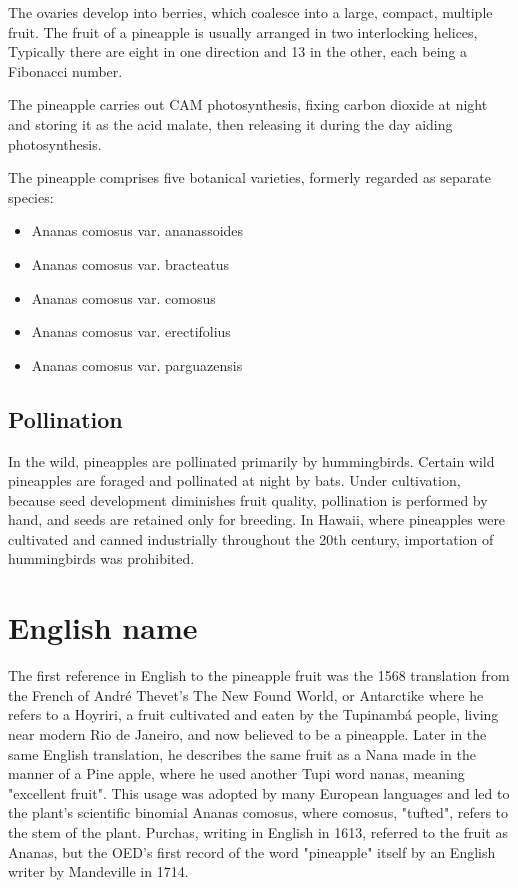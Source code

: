 \documentclass{article}
\begin{document}
The ovaries develop into berries, which coalesce into a large, compact, multiple fruit. The fruit of a pineapple is usually arranged in two interlocking helices, Typically there are eight in one direction and 13 in the other, each being a Fibonacci number.

The pineapple carries out CAM photosynthesis, fixing carbon dioxide at night and storing it as the acid malate, then releasing it during the day aiding photosynthesis.

The pineapple comprises five botanical varieties, formerly regarded as separate species:
\begin{itemize}
    \item  Ananas comosus var. ananassoides
    \item Ananas comosus var. bracteatus
    \item Ananas comosus var. comosus
    \item Ananas comosus var. erectifolius
    \item Ananas comosus var. parguazensis
\end{itemize}
\subsection{Pollination}
In the wild, pineapples are pollinated primarily by hummingbirds. Certain wild pineapples are foraged and pollinated at night by bats. Under cultivation, because seed development diminishes fruit quality, pollination is performed by hand, and seeds are retained only for breeding. In Hawaii, where pineapples were cultivated and canned industrially throughout the 20th century, importation of hummingbirds was prohibited.
\section{English name}
The first reference in English to the pineapple fruit was the 1568 translation from the French of André Thevet's The New Found World, or Antarctike where he refers to a Hoyriri, a fruit cultivated and eaten by the Tupinambá people, living near modern Rio de Janeiro, and now believed to be a pineapple. Later in the same English translation, he describes the same fruit as a Nana made in the manner of a Pine apple, where he used another Tupi word nanas, meaning "excellent fruit". This usage was adopted by many European languages and led to the plant's scientific binomial Ananas comosus, where comosus, "tufted", refers to the stem of the plant. Purchas, writing in English in 1613, referred to the fruit as Ananas, but the OED's first record of the word "pineapple" itself by an English writer by Mandeville in 1714.
\end{document}
